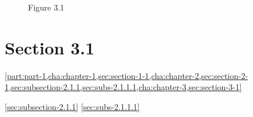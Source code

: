 \documentclass{book}
\begin{document}
\begin{figure}
  \centering

  \caption{Figure 3.1}
  \label{fig:figure-3-1}
\end{figure}

\section{Section 3.1}
\label{sec:section-3-1}

\cref{part:part-1,cha:chapter-1,sec:section-1-1,cha:chapter-2,sec:section-2-1,sec:subsection-2.1.1,sec:subs-2.1.1.1,cha:chapter-3,sec:section-3-1}

\cref{sec:subsection-2.1.1}
\cref{sec:subs-2.1.1.1}
\end{document}
